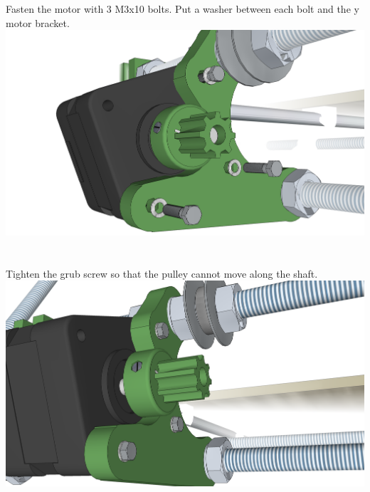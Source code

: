 \documentclass[twoside,openany,a4paper,titlepage]{memoir}
\begin{document}
	\section{}
	Fasten the motor with 3 M3x10 bolts. Put a washer between each bolt and the y motor bracket.\\
	\includegraphics[width=1\linewidth]{graphics/ch6_18.png}
	
	\section{}
	Tighten the grub screw so that the pulley cannot move along the shaft.\\
	\includegraphics[width=1\linewidth]{graphics/ch6_19.png}
	
\end{document}
